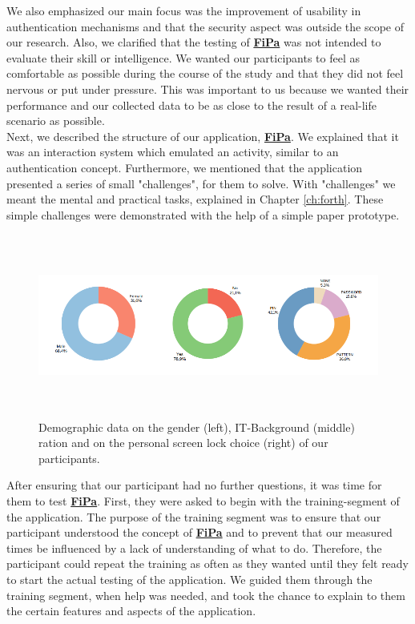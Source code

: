 We also emphasized our main focus was the improvement of usability in authentication mechanisms and that the security aspect was outside the scope of our research. Also, we clarified that the testing of \underline{\textbf{FiPa}} was not intended to evaluate their skill or intelligence. We wanted our participants to feel as comfortable as possible during the course of the study and that they did not feel nervous or put under pressure. This was important to us because we wanted their performance and our collected data to be as close to the result of a real-life scenario as possible. \\

Next, we described the structure of our application, \underline{\textbf{FiPa}}. We explained that it was an interaction system which emulated an activity, similar to an authentication concept. Furthermore, we mentioned that the application presented a series of small "challenges", for them to solve. With "challenges" we meant the mental and practical tasks, explained in Chapter \ref{ch:forth}. These simple challenges were demonstrated with the help of a simple paper prototype.\\

\begin{figure}[t!]
\centering
\includegraphics[width=16cm, height=6cm]{Chapters/graphics/Demos.PNG}
\caption{Demographic data on the gender (left), IT-Background (middle) ration and on the personal screen lock choice (right) of our participants.}
\label{fig:demo}
\end{figure}

After ensuring that our participant had no further questions, it was time for them to test \underline{\textbf{FiPa}}. First, they were asked to begin with the training-segment of the application. The purpose of the training segment was to ensure that our participant understood the concept of \underline{\textbf{FiPa}} and to prevent that our measured times be influenced by a lack of understanding of what to do. Therefore, the participant could repeat the training as often as they wanted until they felt ready to start the actual testing of the application. We guided them through the training segment, when help was needed, and took the chance to explain to them the certain features and aspects of the application. \\

